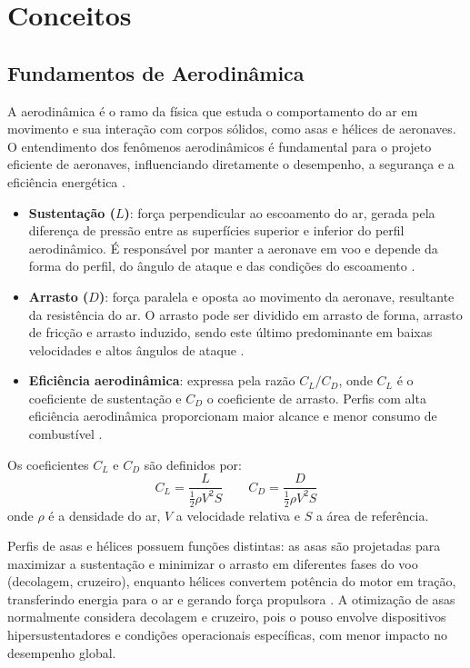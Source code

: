 \chapter{Conceitos}

\section{Fundamentos de Aerodinâmica}
A aerodinâmica é o ramo da física que estuda o comportamento do ar em movimento e sua interação com corpos sólidos, como asas e hélices de aeronaves. O entendimento dos fenômenos aerodinâmicos é fundamental para o projeto eficiente de aeronaves, influenciando diretamente o desempenho, a segurança e a eficiência energética \cite{anderson2017fundamentals}.

\begin{itemize}
    \item \textbf{Sustentação (\(L\))}: força perpendicular ao escoamento do ar, gerada pela diferença de pressão entre as superfícies superior e inferior do perfil aerodinâmico. É responsável por manter a aeronave em voo e depende da forma do perfil, do ângulo de ataque e das condições do escoamento \cite{anderson2017fundamentals}.
    \item \textbf{Arrasto (\(D\))}: força paralela e oposta ao movimento da aeronave, resultante da resistência do ar. O arrasto pode ser dividido em arrasto de forma, arrasto de fricção e arrasto induzido, sendo este último predominante em baixas velocidades e altos ângulos de ataque \cite{raymer2018aircraft}.
    \item \textbf{Eficiência aerodinâmica}: expressa pela razão \(C_L/C_D\), onde \(C_L\) é o coeficiente de sustentação e \(C_D\) o coeficiente de arrasto. Perfis com alta eficiência aerodinâmica proporcionam maior alcance e menor consumo de combustível \cite{abbott1959theory}.
\end{itemize}

Os coeficientes \(C_L\) e \(C_D\) são definidos por:
\[
C_L = \frac{L}{\frac{1}{2} \rho V^2 S}
\qquad
C_D = \frac{D}{\frac{1}{2} \rho V^2 S}
\]
onde \(\rho\) é a densidade do ar, \(V\) a velocidade relativa e \(S\) a área de referência.

Perfis de asas e hélices possuem funções distintas: as asas são projetadas para maximizar a sustentação e minimizar o arrasto em diferentes fases do voo (decolagem, cruzeiro), enquanto hélices convertem potência do motor em tração, transferindo energia para o ar e gerando força propulsora \cite{anderson2017fundamentals}. A otimização de asas normalmente considera decolagem e cruzeiro, pois o pouso envolve dispositivos hipersustentadores e condições operacionais específicas, com menor impacto no desempenho global.

